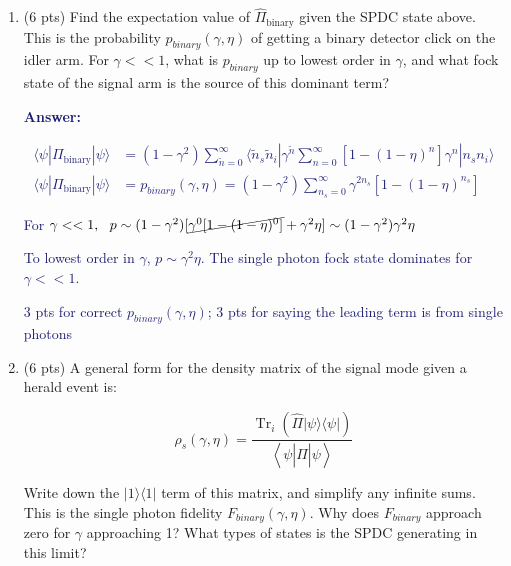 \documentclass[11pt]{caltech_thesis} %
\begin{document}
\begin{enumerate}
\def\labelenumi{\arabic{enumi}.}
\item
  (6 pts) Find the expectation value of \(\hat{\Pi}_{\text {binary}}\)
  given the SPDC state above. This is the probability
  \(p_{binary}\left(\gamma, \eta\right)\) of getting a binary detector
  click on the idler arm. For \(\gamma << 1\), what is \(p_{binary}\) up
  to lowest order in \(\gamma\), and what fock state of the signal arm
  is the source of this dominant term?

  \textcolor{midnightblue}{ \textbf{Answer:} }

  \textcolor{midnightblue}{

  \[\begin{aligned}
   \langle \psi | \Pi_{\text {binary}} | \psi \rangle &= (1- \gamma^2) \sum_{\tilde{n}=0}^{\infty} \langle \tilde{n}_s \tilde{n}_i | \gamma^{\tilde{n}} \sum_{n=0}^{\infty}[1 - (1-\eta)^{n}] \gamma^n | n_s n_i \rangle \\
   \langle \psi | \Pi_{\text {binary}} | \psi \rangle &= p_{binary}(\gamma, \eta) =  \boxed{(1-\gamma^2) \sum_{n_s=0}^{\infty} \gamma^{2n_s} [1 - (1 - \eta)^{n_s}]}
   \end{aligned}\]

  }

  \textcolor{midnightblue}{For
  \(\gamma << 1, ~~ p \sim (1 - \gamma^2)[\cancel{\gamma^0[1 - (1 - \eta)^0]} + \gamma^{2}\eta ] \sim (1 - \gamma^2)\gamma^{2}\eta\)
  }

  \textcolor{midnightblue}{ To lowest order in \(\gamma\),
  \(p \sim \gamma^{2}\eta\). The single photon fock state dominates for
  \(\gamma << 1\). }

  \textcolor{midnightblue}{ 3 pts for correct
  \(p_{binary}(\gamma, \eta)\); 3 pts for saying the leading term is
  from single photons }
\item
  (6 pts) A general form for the density matrix of the signal mode given
  a herald event is:

  \[\rho_{s}\left(\gamma, \eta\right)=\frac{\operatorname{Tr}_{i}\left(\hat{\Pi}|\psi\rangle\langle\psi|\right)}{\left\langle\psi\left|\hat{\Pi}\right| \psi\right\rangle}\]

  Write down the \(|1\rangle\langle1|\) term of this matrix, and
  simplify any infinite sums. This is the single photon fidelity
  \(F_{binary}(\gamma, \eta)\). Why does \(F_{binary}\) approach zero
  for \(\gamma\) approaching 1? What types of states is the SPDC
  generating in this limit?


\end{enumerate}
\end{document}
